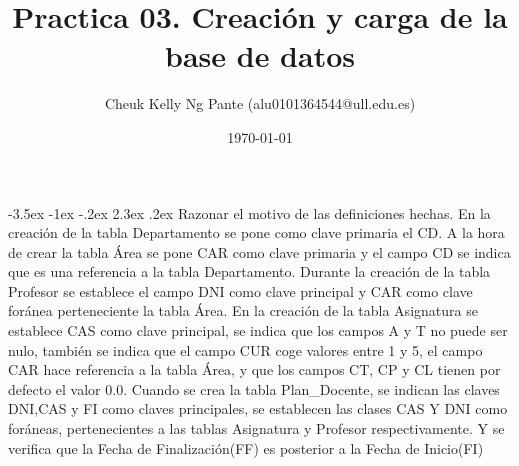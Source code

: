 \documentclass[11pt]{report}
\makeatletter
\newcommand{\subtitle}[1]{
  \posttitle{
    \par\end{center}
    \begin{center}\large#1\end{center}
    \vskip0.5em}
}
\renewcommand\chapter{\@startsection{chapter}{0}{\z@}%
    {-3.5ex \@plus -1ex \@minus -.2ex}%
    {2.3ex \@plus.2ex}%
    {\normalfont\Large\bfseries}}
\makeatother
\begin{document}
\title{Practica 03. Creación y carga de la base de datos}
\subtitle{Bases de Datos}
\author{Cheuk Kelly Ng Pante (alu0101364544@ull.edu.es)}
\date{\today}

\maketitle

\pagestyle{empty} %

\tableofcontents

\cleardoublepage

\pagestyle{plain} %
\setcounter{page}{1} %

\chapter{Razonar el motivo de las definiciones hechas.}
En la creación de la tabla Departamento se pone como clave primaria el CD. A la
hora de crear la tabla Área se pone CAR como clave primaria y el campo CD se
indica que es una referencia a la tabla Departamento.
Durante la creación de la tabla Profesor se establece el campo DNI como clave
principal y CAR como clave foránea perteneciente la tabla Área.
En la creación de la tabla Asignatura se establece CAS como clave principal, se
indica que los campos A y T no puede ser nulo, también se indica que el campo
CUR coge valores entre 1 y 5, el campo CAR hace referencia a la tabla Área, y que
los campos CT, CP y CL tienen por defecto el valor 0.0.
Cuando se crea la tabla Plan\_Docente, se indican las claves DNI,CAS y FI como
claves principales, se establecen las clases CAS Y DNI como foráneas,
pertenecientes a las tablas Asignatura y Profesor respectivamente. Y se verifica
que la Fecha de Finalización(FF) es posterior a la Fecha de Inicio(FI)
\end{document}
